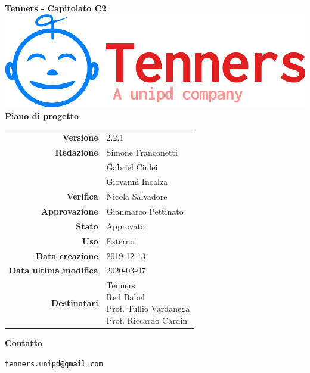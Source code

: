 \begin{titlepage}
	\begin{center}
		\large \textbf{Tenners - Capitolato C2}
		\vfill
		\includegraphics[scale = 0.3]{./res/img/logo.png}\\
		\vfill
		\Huge \textbf{Piano di progetto}

        \vfill
        \large

        \begin{tabular}{r|l}
                        \textbf{Versione} & 2.2.1 \\
                        \textbf{Redazione} &
                        Simone Franconetti\\&
                        Gabriel Ciulei\\&
												Giovanni Incalza\\
                        \textbf{Verifica} &
                        Nicola Salvadore\\
                        \textbf{Approvazione} & Gianmarco Pettinato\\
                        \textbf{Stato} & Approvato \\
                        \textbf{Uso} &  Esterno\\
                        \textbf{Data creazione} &  2019-12-13\\
                        \textbf{Data ultima modifica} &  2020-03-07\\
                        \textbf{Destinatari} & \parbox[t]{5cm}{Tenners\\Red Babel\\Prof. Tullio Vardanega\\Prof. Riccardo Cardin}
                \end{tabular}
                \vfill
                \normalsize
                \vfill
                \textbf{Contatto}

                \texttt{tenners.unipd@gmail.com}

	\end{center}
\end{titlepage}
